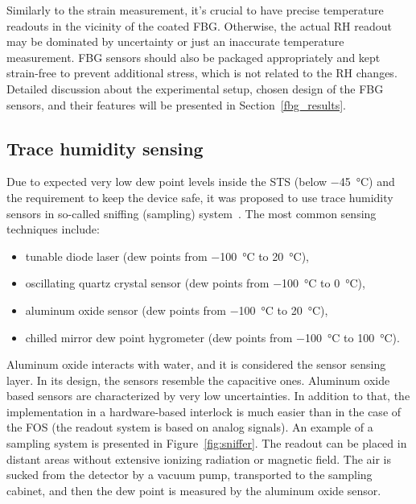 Similarly to the strain measurement, it’s crucial to have precise temperature readouts in the vicinity of the coated \gls{FBG}. Otherwise, the actual RH readout may be dominated by uncertainty or just an inaccurate temperature measurement. \gls{FBG} sensors should also be packaged appropriately and kept strain-free to prevent additional stress, which is not related to the RH changes. Detailed discussion about the experimental setup, chosen design of the \gls{FBG} sensors, and their features will be presented in Section~\ref{fbg_results}.



\subsection{Trace humidity sensing}

Due to expected very low dew point levels inside the \gls{STS} (below \SI{-45}{\celsius}) and the requirement to keep the device safe, it was proposed to use trace humidity sensors in so-called sniffing (sampling) system~\cite{Berruti}. The most common sensing techniques include:
\begin{itemize}
    \item tunable diode laser (dew points from \SI{-100}{\celsius} to \SI{20}{\celsius}),
    \item oscillating quartz crystal sensor (dew points from \SI{-100}{\celsius} to \SI{0}{\celsius}),
    \item aluminum oxide sensor (dew points from \SI{-100}{\celsius} to \SI{20}{\celsius}),
    \item chilled mirror dew point hygrometer  (dew points from \SI{-100}{\celsius} to \SI{100}{\celsius}).
\end{itemize}

Aluminum oxide interacts with water, and it is considered the sensor sensing layer. In its design, the sensors resemble the capacitive ones. Aluminum oxide based sensors are characterized by very low uncertainties. In addition to that, the implementation in a hardware-based interlock is much easier than in the case of the \gls{FOS} (the readout system is based on analog signals). An example of a sampling system is presented in Figure~\ref{fig:sniffer}. The readout can be placed in distant areas without extensive ionizing radiation or magnetic field. The air is sucked from the detector by a vacuum pump, transported to the sampling cabinet, and then the dew point is measured by the aluminum oxide sensor.  


